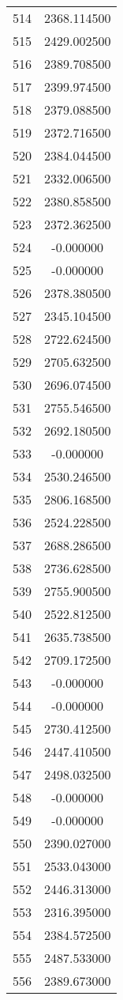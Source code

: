 \documentclass[12pt]{article}
\begin{document}
\begin{longtable}{@{}cc@{}}
514 & 2368.114500 \\
515 & 2429.002500 \\
516 & 2389.708500 \\
517 & 2399.974500 \\
518 & 2379.088500 \\
519 & 2372.716500 \\
520 & 2384.044500 \\
521 & 2332.006500 \\
522 & 2380.858500 \\
523 & 2372.362500 \\
524 & -0.000000 \\
525 & -0.000000 \\
526 & 2378.380500 \\
527 & 2345.104500 \\
528 & 2722.624500 \\
529 & 2705.632500 \\
530 & 2696.074500 \\
531 & 2755.546500 \\
532 & 2692.180500 \\
533 & -0.000000 \\
534 & 2530.246500 \\
535 & 2806.168500 \\
536 & 2524.228500 \\
537 & 2688.286500 \\
538 & 2736.628500 \\
539 & 2755.900500 \\
540 & 2522.812500 \\
541 & 2635.738500 \\
542 & 2709.172500 \\
543 & -0.000000 \\
544 & -0.000000 \\
545 & 2730.412500 \\
546 & 2447.410500 \\
547 & 2498.032500 \\
548 & -0.000000 \\
549 & -0.000000 \\
550 & 2390.027000 \\
551 & 2533.043000 \\
552 & 2446.313000 \\
553 & 2316.395000 \\
554 & 2384.572500 \\
555 & 2487.533000 \\
556 & 2389.673000 \\

\end{longtable}
\end{document}

